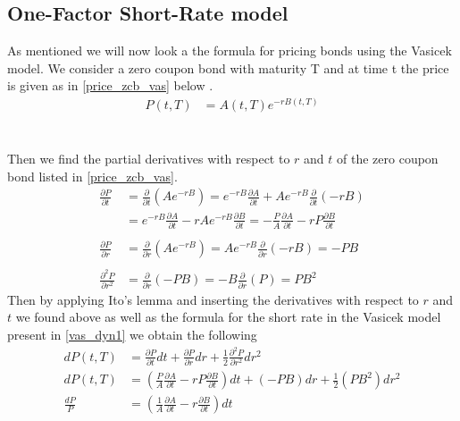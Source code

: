 \begin{appendices} 
 \chapter{One-Factor Short-Rate model}\label{appendices}
   
 As mentioned we will now look a the formula for pricing bonds using the Vasicek model. We consider a zero coupon bond
 with maturity T and at time t the price is given as in \autoref{price_zcb_vas} below \cite{Bjork}.
 \begin{align}
     P(t,T) &= A(t,T) e^{-rB(t,T)} 
     \label{price_zcb_vas} 
 \end{align}
 \\\\
 Then we find the partial derivatives with respect to $r$ and $t$ of the zero coupon bond listed in \autoref{price_zcb_vas}.
 \begin{align*}
     \frac{\partial P}{\partial t} &= \frac{\partial}{\partial t} (Ae^{-rB}) 
     = e^{-rB} \frac{\partial A}{\partial t} + Ae^{-rB} \frac{\partial}{\partial t} (-rB) \\
     &= e^{-rB} \frac{\partial A}{\partial t} - rAe^{-rB} \frac{\partial B}{\partial t} = 
     - \frac{P}{A} \frac{\partial A}{\partial t} - rP \frac{\partial B}{\partial t}
     \\\\
     \frac{\partial P}{\partial r} &= \frac{\partial}{\partial r} (Ae^{-rB}) 
     = Ae^{-rB} \frac{\partial}{\partial r} (-rB) = -PB 
     \\\\
     \frac{\partial^2 P}{\partial r^2} &= \frac{\partial}{\partial r} (-PB) = -B \frac{\partial}{\partial r} (P) = PB^2
 \end{align*}
 Then by applying Ito's lemma \cite{Bjork} and inserting the derivatives with respect to $r$ and $t$ we found above as well as
  the formula for the short rate in the Vasicek model present in \autoref{vas_dyn1} we obtain the following
 \begin{align*}
     dP(t,T) &= \frac{\partial P}{\partial t} dt + \frac{\partial P}{\partial r} dr 
     + \frac{1}{2} \frac{\partial^2 P}{\partial r^2} dr^2 \\
     dP(t,T) &= \left( \frac{P}{A} \frac{\partial A}{\partial t} - rP \frac{\partial B}{\partial t} \right) dt 
     + (-PB) dr + \frac{1}{2} (PB^2) dr^2 \\
     \frac{dP}{P} &= \left( \frac{1}{A} \frac{\partial A}{\partial t} - r \frac{\partial B}{\partial t} \right) dt 

\end{align*}
\end{appendices}
